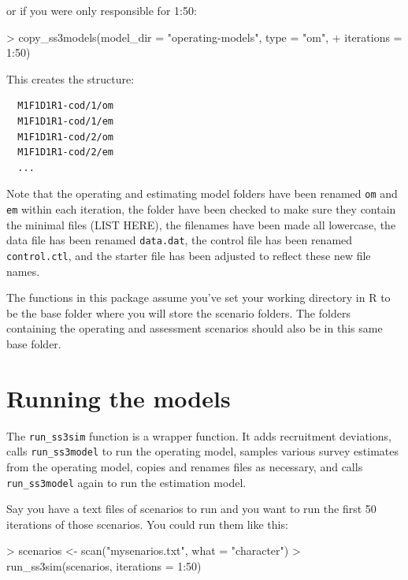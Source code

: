 \documentclass[12pt]{article}
\begin{document}
\noindent
or if you were only responsible for 1:50:

\begin{Schunk}
\begin{Sinput}
> copy_ss3models(model_dir = "operating-models", type = "om", 
+   iterations = 1:50)
\end{Sinput}
\end{Schunk}

\noindent
This creates the structure:

\begin{verbatim}
  M1F1D1R1-cod/1/om
  M1F1D1R1-cod/1/em
  M1F1D1R1-cod/2/om
  M1F1D1R1-cod/2/em
  ...
\end{verbatim}

\noindent
Note that the operating and estimating model folders have been renamed
\texttt{om} and \texttt{em} within each iteration, the folder have been checked to make sure they contain the minimal files (LIST HERE), the filenames have been made all lowercase, the data file has been renamed \texttt{data.dat}, the control file has been renamed \texttt{control.ctl}, and the starter file has been adjusted to reflect these new file names.

The functions in this package assume you've set your working directory in R to be the base folder where you will store the scenario folders. The folders containing the operating and assessment scenarios should also be in this same base folder.

\section*{Running the models}

The \texttt{run\_ss3sim} function is a wrapper function. It adds recruitment deviations, calls \texttt{run\_ss3model} to run the operating model, samples various survey estimates from the operating model, copies and renames files as necessary, and calls \texttt{run\_ss3model} again to run the estimation model.

Say you have a text files of scenarios to run and you want to run the first 50 iterations of those scenarios. You could run them like this:

\begin{Schunk}
\begin{Sinput}
> scenarios <- scan("mysenarios.txt", what = "character")
> run_ss3sim(scenarios, iterations = 1:50)
\end{Sinput}
\end{Schunk}
\end{document}
